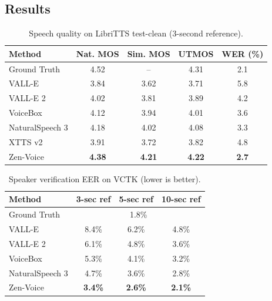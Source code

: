 \documentclass[11pt,a4paper]{article}
\begin{document}
\subsection{Results}

\begin{table}[t]
\centering
\caption{Speech quality on LibriTTS test-clean (3-second reference).}
\label{tab:quality}
\begin{tabular}{lcccc}
\toprule
\textbf{Method} & \textbf{Nat. MOS} & \textbf{Sim. MOS} & \textbf{UTMOS} & \textbf{WER (\%)} \\
\midrule
Ground Truth & 4.52 & -- & 4.31 & 2.1 \\
\midrule
VALL-E & 3.84 & 3.62 & 3.71 & 5.8 \\
VALL-E 2 & 4.02 & 3.81 & 3.89 & 4.2 \\
VoiceBox & 4.12 & 3.94 & 4.01 & 3.6 \\
NaturalSpeech 3 & 4.18 & 4.02 & 4.08 & 3.3 \\
XTTS v2 & 3.91 & 3.72 & 3.82 & 4.8 \\
\midrule
Zen-Voice & \textbf{4.38} & \textbf{4.21} & \textbf{4.22} & \textbf{2.7} \\
\bottomrule
\end{tabular}
\end{table}

\begin{table}[t]
\centering
\caption{Speaker verification EER on VCTK (lower is better).}
\label{tab:speaker_ver}
\begin{tabular}{lccc}
\toprule
\textbf{Method} & \textbf{3-sec ref} & \textbf{5-sec ref} & \textbf{10-sec ref} \\
\midrule
Ground Truth & \multicolumn{3}{c}{1.8\%} \\
\midrule
VALL-E & 8.4\% & 6.2\% & 4.8\% \\
VALL-E 2 & 6.1\% & 4.8\% & 3.6\% \\
VoiceBox & 5.3\% & 4.1\% & 3.2\% \\
NaturalSpeech 3 & 4.7\% & 3.6\% & 2.8\% \\
\midrule
Zen-Voice & \textbf{3.4\%} & \textbf{2.6\%} & \textbf{2.1\%} \\
\bottomrule
\end{tabular}
\end{table}
\end{document}
